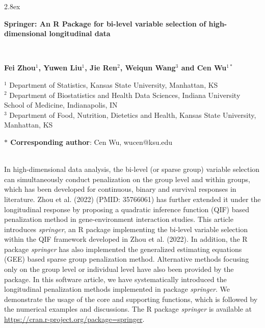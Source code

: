 \documentclass[12pt]{article}
\def\doublespace{\baselineskip=22pt}
\begin{document}
\doublespace
\baselineskip 2.8ex
\begin{center}
{\bf\Huge Springer: An R Package for bi-level variable selection of high-dimensional longitudinal data }

\

{\bf Fei Zhou$^{1}$, Yuwen Liu$^{1}$, Jie Ren$^{2}$, Weiqun Wang$^{3}$ and Cen Wu$^{1\ast}$}
\vspace{0.6em}

{ $^1$ Department of Statistics, Kansas State University, Manhattan, KS}\\

{ $^2$ Department of Biostatistics and Health Data Sciences, Indiana University School of Medicine, Indianapolis, IN}\\

{ $^3$ 
	Department of Food, Nutrition, Dietetics and Health, Kansas State University, Manhattan, KS}\\

\end{center}

{\bf $\ast$ Corresponding author}:
Cen Wu, wucen@ksu.edu\\
\vspace{0.8em}

\\

\noindent In high-dimensional data analysis, the bi-level (or sparse group) variable selection can simultaneously conduct penalization on the group level and within groups, which has been developed for continuous, binary and survival responses in literature. Zhou et al. (2022) (PMID: 35766061) has further extended it under the longitudinal response by proposing a quadratic inference function (QIF) based penalization method {\color{blue} in gene-environment interaction studies. This article introduces \emph{springer}, an R package implementing the bi-level variable selection within the QIF framework developed in Zhou et al. (2022).} In addition, the R package \emph{springer} has also implemented the generalized estimating equations (GEE) based sparse group penalization method. Alternative methods focusing only on the group level or individual level have also been provided by the package. In this software article, we have systematically introduced the longitudinal penalization methods implemented in package \emph{springer}. We demonstrate the usage of the core and supporting functions, which is followed by the numerical examples and discussions. The R package \emph{springer} is available at \url{https://cran.r-project.org/package=springer}. \\
\end{document}
